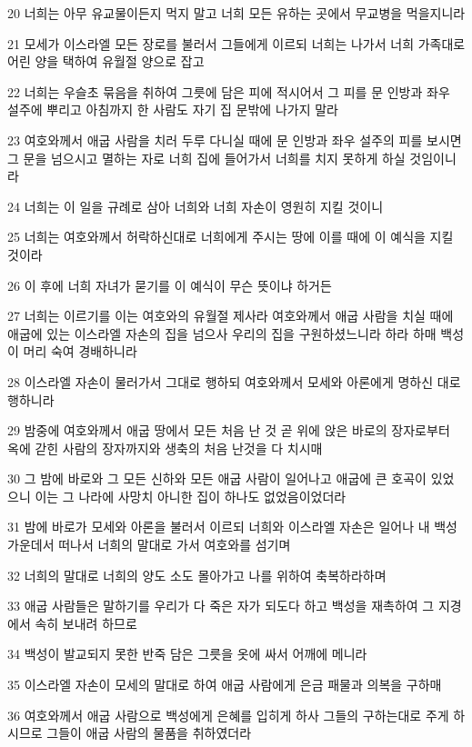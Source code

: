 \par 20 너희는 아무 유교물이든지 먹지 말고 너희 모든 유하는 곳에서 무교병을 먹을지니라
\par 21 모세가 이스라엘 모든 장로를 불러서 그들에게 이르되 너희는 나가서 너희 가족대로 어린 양을 택하여 유월절 양으로 잡고
\par 22 너희는 우슬초 묶음을 취하여 그릇에 담은 피에 적시어서 그 피를 문 인방과 좌우 설주에 뿌리고 아침까지 한 사람도 자기 집 문밖에 나가지 말라
\par 23 여호와께서 애굽 사람을 치러 두루 다니실 때에 문 인방과 좌우 설주의 피를 보시면 그 문을 넘으시고 멸하는 자로 너희 집에 들어가서 너희를 치지 못하게 하실 것임이니라
\par 24 너희는 이 일을 규례로 삼아 너희와 너희 자손이 영원히 지킬 것이니
\par 25 너희는 여호와께서 허락하신대로 너희에게 주시는 땅에 이를 때에 이 예식을 지킬 것이라
\par 26 이 후에 너희 자녀가 묻기를 이 예식이 무슨 뜻이냐 하거든
\par 27 너희는 이르기를 이는 여호와의 유월절 제사라 여호와께서 애굽 사람을 치실 때에 애굽에 있는 이스라엘 자손의 집을 넘으사 우리의 집을 구원하셨느니라 하라 하매 백성이 머리 숙여 경배하니라
\par 28 이스라엘 자손이 물러가서 그대로 행하되 여호와께서 모세와 아론에게 명하신 대로 행하니라
\par 29 밤중에 여호와께서 애굽 땅에서 모든 처음 난 것 곧 위에 앉은 바로의 장자로부터 옥에 갇힌 사람의 장자까지와 생축의 처음 난것을 다 치시매
\par 30 그 밤에 바로와 그 모든 신하와 모든 애굽 사람이 일어나고 애굽에 큰 호곡이 있었으니 이는 그 나라에 사망치 아니한 집이 하나도 없었음이었더라
\par 31 밤에 바로가 모세와 아론을 불러서 이르되 너희와 이스라엘 자손은 일어나 내 백성 가운데서 떠나서 너희의 말대로 가서 여호와를 섬기며
\par 32 너희의 말대로 너희의 양도 소도 몰아가고 나를 위하여 축복하라하며
\par 33 애굽 사람들은 말하기를 우리가 다 죽은 자가 되도다 하고 백성을 재촉하여 그 지경에서 속히 보내려 하므로
\par 34 백성이 발교되지 못한 반죽 담은 그릇을 옷에 싸서 어깨에 메니라
\par 35 이스라엘 자손이 모세의 말대로 하여 애굽 사람에게 은금 패물과 의복을 구하매
\par 36 여호와께서 애굽 사람으로 백성에게 은혜를 입히게 하사 그들의 구하는대로 주게 하시므로 그들이 애굽 사람의 물품을 취하였더라
